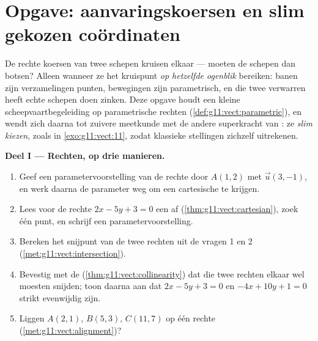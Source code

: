 \section{Opgave: aanvaringskoersen en slim gekozen coördinaten}

\begin{problem}
\label{pb:g11:vect:1}
De rechte koersen van twee schepen kruisen elkaar --- moeten de schepen dan
botsen? Alleen wanneer ze het kruispunt \emph{op hetzelfde ogenblik}
bereiken: banen zijn verzamelingen punten, bewegingen zijn parametrisch, en
die twee verwarren heeft echte schepen doen zinken. Deze opgave houdt een
kleine scheepvaartbegeleiding op parametrische rechten
(\cref{def:g11:vect:parametric}), en wendt zich daarna tot zuivere meetkunde
met de andere superkracht van : ze \emph{slim kiezen}, zoals in
\cref{exo:g11:vect:11}, zodat klassieke stellingen zichzelf uitrekenen.

\medskip
\noindent\textbf{Deel I --- Rechten, op drie manieren.}
\begin{enumerate}
  \item Geef een parametervoorstelling van de rechte door $A(1, 2)$ met
         $\vec u(3, -1)$, en werk daarna de parameter weg om
        een cartesische  te krijgen.
  \item Lees voor de rechte $2x - 5y + 3 = 0$ een  af
        (\cref{thm:g11:vect:cartesian}), zoek één punt, en schrijf een
        parametervoorstelling.
  \item Bereken het snijpunt van de twee rechten uit de vragen 1 en 2
        (\cref{met:g11:vect:intersection}).
  \item Bevestig met de  (\cref{thm:g11:vect:collinearity}) dat
        die twee rechten elkaar wel moesten snijden; toon daarna aan dat
        $2x - 5y + 3 = 0$ en $-4x + 10y + 1 = 0$ strikt evenwijdig zijn.
  \item Liggen $A(2, 1)$, $B(5, 3)$, $C(11, 7)$ op één rechte
        (\cref{met:g11:vect:alignment})?
\end{enumerate}


\end{problem}

